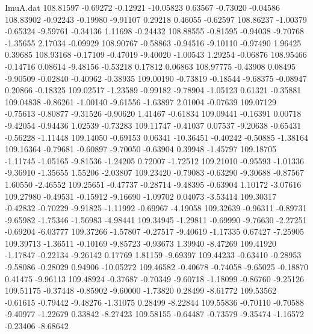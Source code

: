 \begin{filecontents}{ImuA.dat}
 108.81597   -0.69272   -0.12921  -10.05823    0.63567   -0.73020   -0.04586
 108.83902   -0.92243   -0.19980   -9.91107    0.29218    0.46055   -0.62597
 108.86237   -1.00379   -0.65324   -9.59761   -0.34136    1.11698   -0.24432
 108.88555   -0.81595   -0.94038   -9.70768   -1.35655    2.17034   -0.09929
 108.90767   -0.58863   -0.94516   -9.10110   -0.97490    1.96425    0.39685
 108.93168   -0.17109   -0.47019   -9.40020   -1.00543    1.29254   -0.06876
 108.95466   -0.14716    0.08614   -9.48156   -0.53218    0.17812    0.06863
 108.97775   -0.43908    0.08495   -9.90509   -0.02840   -0.40962   -0.38935
 109.00190   -0.73819   -0.18544   -9.68375   -0.08947    0.20866   -0.18325
 109.02517   -1.23589   -0.99182   -9.78904   -1.05123    0.61321   -0.35881
 109.04838   -0.86261   -1.00140   -9.61556   -1.63897    2.01004   -0.07639
 109.07129   -0.75613   -0.80877   -9.31526   -0.90620    1.41467   -0.61834
 109.09441   -0.16391    0.00718   -9.42054   -0.94436    1.02539   -0.73283
 109.11747   -0.41037    0.07537   -9.20638   -0.65431   -0.56228   -1.11448
 109.14050   -0.69153    0.06341  -10.36451   -0.40242   -0.50885   -1.38164
 109.16364   -0.79681   -0.60897   -9.70050   -0.63904    0.39948   -1.45797
 109.18705   -1.11745   -1.05165   -9.81536   -1.24205    0.72007   -1.72512
 109.21010   -0.95593   -1.01336   -9.36910   -1.35655    1.55206   -2.03807
 109.23420   -0.79083   -0.63290   -9.30688   -0.87567    1.60550   -2.46552
 109.25651   -0.47737   -0.28714   -9.48395   -0.63904    1.10172   -3.07616
 109.27980   -0.49531   -0.15912   -9.16690   -1.09702    0.04073   -3.53414
 109.30317   -0.42832   -0.70229   -9.91825   -1.11992   -0.69967   -4.19058
 109.32639   -0.96311   -0.89731   -9.65982   -1.75346   -1.56983   -4.98441
 109.34945   -1.29811   -0.69990   -9.76630   -2.27251   -0.69204   -6.03777
 109.37266   -1.57807   -0.27517   -9.40619   -1.17335    0.67427   -7.25905
 109.39713   -1.36511   -0.10169   -9.85723   -0.93673    1.39940   -8.47269
 109.41920   -1.17847   -0.22134   -9.26142    0.17769    1.81159   -9.69397
 109.44233   -0.63410   -0.28953   -9.58086   -0.28029    0.94906  -10.05272
 109.46582   -0.40678   -0.74058   -9.65025   -0.18870    0.41475   -9.96113
 109.48924   -0.37687   -0.70349   -9.60718   -1.18099   -0.86760   -9.25126
 109.51175   -0.37448   -0.85902   -9.60000   -1.73820    0.28499   -8.61772
 109.53562   -0.61615   -0.79442   -9.48276   -1.31075    0.28499   -8.22844
 109.55836   -0.70110   -0.70588   -9.40977   -1.22679    0.33842   -8.27423
 109.58155   -0.64487   -0.73579   -9.35474   -1.16572   -0.23406   -8.68642

\end{filecontents}
